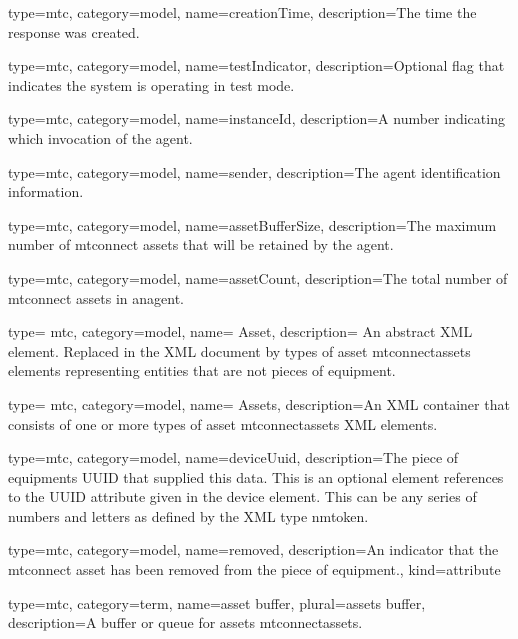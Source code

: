 {
  type=mtc,
  category=model,
  name={creationTime},
  description={The time the response was created.}
}


{
  type=mtc,
  category=model,
  name={testIndicator},
  description={Optional flag that indicates the system is operating in test mode.}
}


{
  type=mtc,
  category=model,
  name={instanceId},
  description={A number indicating which invocation of the \gls{agent}. }
}


{
  type=mtc,
  category=model,
  name={sender},
  description={The \gls{agent} identification information. }
}


{
  type=mtc,
  category=model,
  name={assetBufferSize},
  description={The maximum number of \glspl{mtconnect asset} that will be retained by the \gls{agent}.}
}


{
  type=mtc,
  category=model,
  name={assetCount},
  description={The total number of \glspl{mtconnect asset} in an\gls{agent}.}
}


{
  type= mtc,
  category=model,
  name= {Asset},
  description= {An abstract XML element. Replaced in the XML document by types of \gls{asset mtconnectassets} elements representing entities that are not pieces of equipment.}
}

{
  type= mtc,
  category=model,
  name= {Assets},
  description={An XML container that consists of one or more types of \gls{asset mtconnectassets} XML elements. }
}


{
  type=mtc,
  category=model,
  name={deviceUuid},
  description={The piece of equipments UUID that supplied this data. This is an optional element references to the UUID attribute given in the \gls{device} element. This can be any series of numbers and letters as defined by the XML type \gls{nmtoken}.}
}


{
  type=mtc,
  category=model,
  name={removed},
  description={An indicator that the \gls{mtconnect asset} has been removed from the piece of equipment.},
  kind={attribute}
}

{
  type=mtc,
  category=term,
  name={asset buffer},
  plural={assets buffer},
  description={A buffer or queue for \gls{assets mtconnectassets}.}
}


